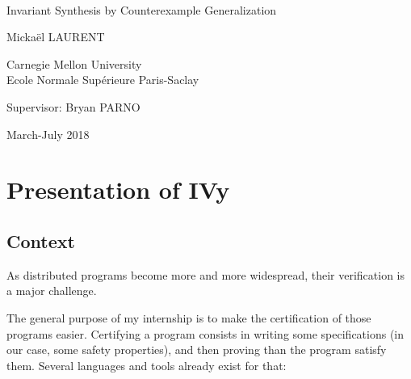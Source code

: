 \documentclass[11pt,a4paper,oldfontcommands,openany]{memoir}
\begin{document}
%
%
\thispagestyle{empty}

{%
\sffamily
\centering
\Large

~\vspace{\fill}

{\huge 
Invariant Synthesis by Counterexample Generalization
}

\vspace{2.5cm}

{\LARGE
Mickaël LAURENT
}

\vspace{3.5cm}

Carnegie Mellon University\\
Ecole Normale Supérieure Paris-Saclay

\vspace{3.5cm}

Supervisor: Bryan PARNO

\vspace{\fill}

March-July 2018

}%

\clearpage%

\tableofcontents*

\clearpage


\chapter{Presentation of IVy}

    \section{Context}

    As distributed programs become more and more widespread, their verification is a major challenge.

    The general purpose of my internship is to make the certification of those programs easier.
    Certifying a program consists in writing some specifications (in our case, some safety properties), and then proving than the program satisfy them.
    Several languages and tools already exist for that:
\end{document}
